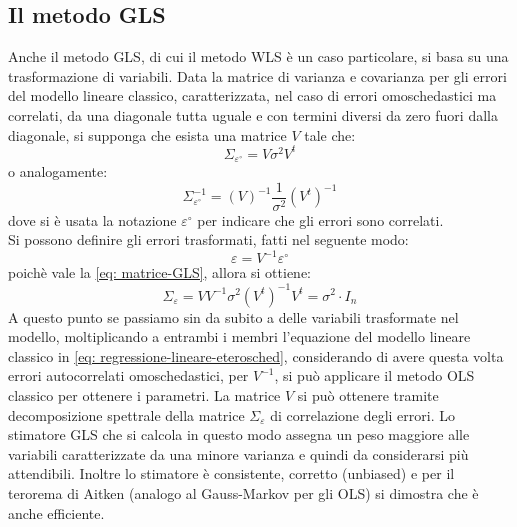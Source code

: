 \documentclass[]{article}
\begin{document}
\subsection{Il metodo GLS}
Anche il metodo GLS, di cui il metodo WLS è un caso particolare, si basa su una trasformazione di variabili.
Data la matrice di varianza e covarianza per gli errori del modello lineare classico, caratterizzata, nel caso di errori omoschedastici ma correlati, da una diagonale tutta uguale e con termini diversi da zero fuori dalla diagonale, si supponga che esista una matrice $V$ tale che:
\begin{equation}
	\Sigma_{\varepsilon^\circ} = V \sigma^2 V^t
	\label{eq: matrice-GLS}
\end{equation}
o analogamente:
\begin{equation}
	\Sigma_{\varepsilon^\circ}^{-1} = (V)^{-1} \frac{1}{\sigma^2} (V^t)^{-1}
\end{equation}
dove si è usata la notazione $\varepsilon^\circ$ per indicare che gli errori sono correlati.\\
Si possono definire gli errori trasformati, fatti nel seguente modo:
\begin{equation}
	\varepsilon = V^{-1} \varepsilon^\circ
\end{equation}
poichè vale la \eqref{eq: matrice-GLS}, allora si ottiene:
\begin{equation}
\Sigma_\varepsilon = VV^{-1} \sigma^2 (V^t)^{-1}V^t = \sigma^2 \cdot I_n
\end{equation}
A questo punto se passiamo sin da subito a delle variabili trasformate nel modello, moltiplicando a entrambi i membri l'equazione del modello lineare classico in \eqref{eq: regressione-lineare-eterosched}, considerando di avere questa volta errori autocorrelati omoschedastici, per $V^{-1}$, si può applicare il metodo OLS classico per ottenere i parametri.
La matrice $V$ si può ottenere tramite decomposizione spettrale della matrice $\Sigma_\varepsilon$ di correlazione degli errori.
Lo stimatore GLS che si calcola in questo modo assegna un peso maggiore alle variabili caratterizzate da una minore varianza e quindi da considerarsi più attendibili. Inoltre lo stimatore è consistente, corretto (unbiased) e per il terorema di Aitken (analogo al Gauss-Markov per gli OLS) si dimostra che è anche efficiente.
\end{document}
